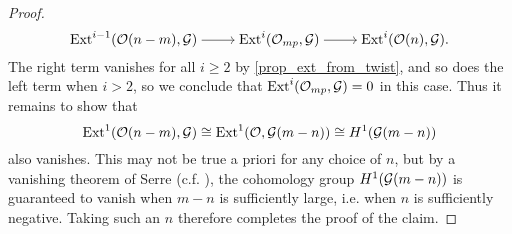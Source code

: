 \begin{proof}
  \[
    \begin{tikzcd}[cramped]
      {\Extalt{i - 1}(\twist{n - m}, \shf{G})} &
      {\Extalt{i}(\skyscraper{mp}, \shf{G})} & {\Extalt{i}(\twist{n}, \shf{G})}.
      \arrow[from=1-1, to=1-2]
      \arrow[from=1-2, to=1-3]
    \end{tikzcd}
  \]
  The right term vanishes for all $i \geq 2$ by
  \cref{prop_ext_from_twist}, and so does the left term when $i > 2$,
  so we conclude that $\operatorname{Ext}^{{i}}(\mathcal{O}_{{mp}}, \mathcal{G}) = 0$ in this case.
  Thus it remains to show that
  \[
    \operatorname{Ext}^{{1}}(\mathcal{O}({n - m}), \mathcal{G})
    \cong
    \operatorname{Ext}^{{1}}(\mathcal{O}, \mathcal{G}(m - n))
    \cong H^1(\mathcal{G}(m - n))
  \]
  also vanishes.
  This may not be true a priori for any choice of $n$, but by a
  vanishing theorem of Serre (c.f.
  \cite[Theorem~III.5.2(b)]{hartshorne}), the cohomology group
  $H^1(\mathcal{G}(m - n))$ is guaranteed to vanish when $m - n$ is
  sufficiently large, i.e. when $n$ is sufficiently negative.
  Taking such an $n$ therefore completes the proof of the claim.
\end{proof}
